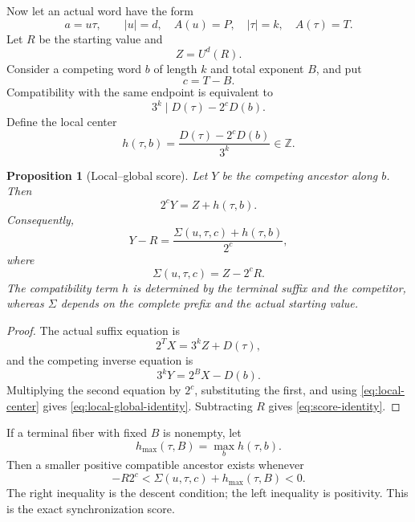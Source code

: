 \documentclass[11pt,reqno]{amsart}
\numberwithin{equation}{section}
\newtheorem{proposition}[theorem]{Proposition}
\theoremstyle{definition}
\theoremstyle{remark}
\newcommand{\Z}{\mathbb Z}
\begin{document}
Now let an actual word have the form
\[
a=u\tau,
\qquad
|u|=d,
\quad A(u)=P,
\quad |\tau|=k,
\quad A(\tau)=T.
\]
Let $R$ be the starting value and
\[
Z=U^d(R).
\]
Consider a competing word $b$ of length $k$ and total exponent $B$, and put
\[
c=T-B.
\]
Compatibility with the same endpoint is equivalent to
\begin{equation}\label{eq:local-compatibility}
3^k\mid D(\tau)-2^cD(b).
\end{equation}
Define the local center
\begin{equation}\label{eq:local-center}
h(\tau,b)
=
\frac{D(\tau)-2^cD(b)}{3^k}
\in\Z.
\end{equation}

\begin{proposition}[Local--global score]\label{prop:local-global-score}
Let $Y$ be the competing ancestor along $b$.  Then
\begin{equation}\label{eq:local-global-identity}
2^cY=Z+h(\tau,b).
\end{equation}
Consequently,
\begin{equation}\label{eq:score-identity}
Y-R
=
\frac{\Sigma(u,\tau,c)+h(\tau,b)}{2^c},
\end{equation}
where
\begin{equation}\label{eq:prefix-surplus}
\Sigma(u,\tau,c)=Z-2^cR.
\end{equation}
The compatibility term $h$ is determined by the terminal suffix and the
competitor, whereas $\Sigma$ depends on the complete prefix and the actual
starting value.
\end{proposition}

\begin{proof}
The actual suffix equation is
\[
2^TX=3^kZ+D(\tau),
\]
and the competing inverse equation is
\[
3^kY=2^BX-D(b).
\]
Multiplying the second equation by $2^c$, substituting the first, and using
\eqref{eq:local-center} gives \eqref{eq:local-global-identity}.  Subtracting
$R$ gives \eqref{eq:score-identity}.
\end{proof}

If a terminal fiber with fixed $B$ is nonempty, let
\[
h_{\max}(\tau,B)=\max_b h(\tau,b).
\]
Then a smaller positive compatible ancestor exists whenever
\begin{equation}\label{eq:score-negative}
-R2^c<\Sigma(u,\tau,c)+h_{\max}(\tau,B)<0.
\end{equation}
The right inequality is the descent condition; the left inequality is
positivity.  This is the exact synchronization score.
\end{document}
